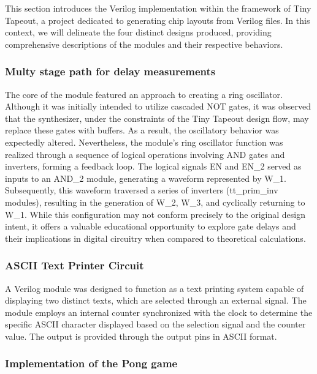 This section introduces the Verilog implementation within the framework of Tiny Tapeout, a project 
dedicated to generating chip layouts from Verilog files. In this context, we will delineate the four 
distinct designs produced, providing comprehensive descriptions of the modules and their respective behaviors.

\subsubsection{Multy stage path for delay measurements}


The core of the module featured an approach to creating a ring oscillator. 
Although it was initially intended to utilize cascaded NOT gates, it was observed that the synthesizer, under the 
constraints of the Tiny Tapeout design flow, may replace these gates with buffers. 
As a result, the oscillatory behavior was expectedly altered. Nevertheless, the module's ring 
oscillator function was realized through a sequence of logical operations involving AND gates and 
inverters, forming a feedback loop. The logical signals EN and EN\_2 served as inputs to an AND\_2 
module, generating a waveform represented by W\_1. Subsequently, this waveform traversed a series of 
inverters (tt\_prim\_inv modules), resulting in the generation of W\_2, W\_3, and cyclically returning to W\_1. 
While this configuration may not conform precisely to the original design intent, it offers a valuable educational 
opportunity to explore gate delays and their implications in digital circuitry when compared to theoretical calculations.

\subsubsection{ASCII Text Printer Circuit}


A Verilog module was designed to function as a text printing system capable of displaying two distinct 
texts, which are selected through an external signal. The module employs an internal counter synchronized 
with the clock to determine the specific ASCII character displayed based on the selection signal and the 
counter value. The output is provided through the output pins in ASCII format.

\subsubsection{Implementation of the Pong game}

